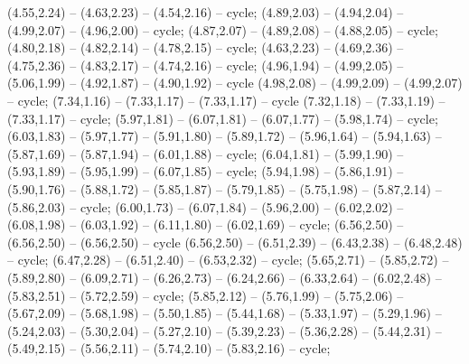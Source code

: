 { (4.55,2.24) -- (4.63,2.23) -- (4.54,2.16) -- cycle;
 (4.89,2.03) -- (4.94,2.04) -- (4.99,2.07) -- (4.96,2.00) -- cycle;
 (4.87,2.07) -- (4.89,2.08) -- (4.88,2.05) -- cycle;
 (4.80,2.18) -- (4.82,2.14) -- (4.78,2.15) -- cycle;
 (4.63,2.23) -- (4.69,2.36) -- (4.75,2.36) -- (4.83,2.17) -- (4.74,2.16) -- cycle;
 (4.96,1.94) -- (4.99,2.05) -- (5.06,1.99) -- (4.92,1.87) -- (4.90,1.92) -- cycle (4.98,2.08) -- (4.99,2.09) -- (4.99,2.07) -- cycle;
 (7.34,1.16) -- (7.33,1.17) -- (7.33,1.17) -- cycle (7.32,1.18) -- (7.33,1.19) -- (7.33,1.17) -- cycle;
 (5.97,1.81) -- (6.07,1.81) -- (6.07,1.77) -- (5.98,1.74) -- cycle;
 (6.03,1.83) -- (5.97,1.77) -- (5.91,1.80) -- (5.89,1.72) -- (5.96,1.64) -- (5.94,1.63) -- (5.87,1.69) -- (5.87,1.94) -- (6.01,1.88) -- cycle;
 (6.04,1.81) -- (5.99,1.90) -- (5.93,1.89) -- (5.95,1.99) -- (6.07,1.85) -- cycle;
 (5.94,1.98) -- (5.86,1.91) -- (5.90,1.76) -- (5.88,1.72) -- (5.85,1.87) -- (5.79,1.85) -- (5.75,1.98) -- (5.87,2.14) -- (5.86,2.03) -- cycle;
 (6.00,1.73) -- (6.07,1.84) -- (5.96,2.00) -- (6.02,2.02) -- (6.08,1.98) -- (6.03,1.92) -- (6.11,1.80) -- (6.02,1.69) -- cycle;
 (6.56,2.50) -- (6.56,2.50) -- (6.56,2.50) -- cycle (6.56,2.50) -- (6.51,2.39) -- (6.43,2.38) -- (6.48,2.48) -- cycle;
 (6.47,2.28) -- (6.51,2.40) -- (6.53,2.32) -- cycle;
 (5.65,2.71) -- (5.85,2.72) -- (5.89,2.80) -- (6.09,2.71) -- (6.26,2.73) -- (6.24,2.66) -- (6.33,2.64) -- (6.02,2.48) -- (5.83,2.51) -- (5.72,2.59) -- cycle;
 (5.85,2.12) -- (5.76,1.99) -- (5.75,2.06) -- (5.67,2.09) -- (5.68,1.98) -- (5.50,1.85) -- (5.44,1.68) -- (5.33,1.97) -- (5.29,1.96) -- (5.24,2.03) -- (5.30,2.04) -- (5.27,2.10) -- (5.39,2.23) -- (5.36,2.28) -- (5.44,2.31) -- (5.49,2.15) -- (5.56,2.11) -- (5.74,2.10) -- (5.83,2.16) -- cycle;
}
